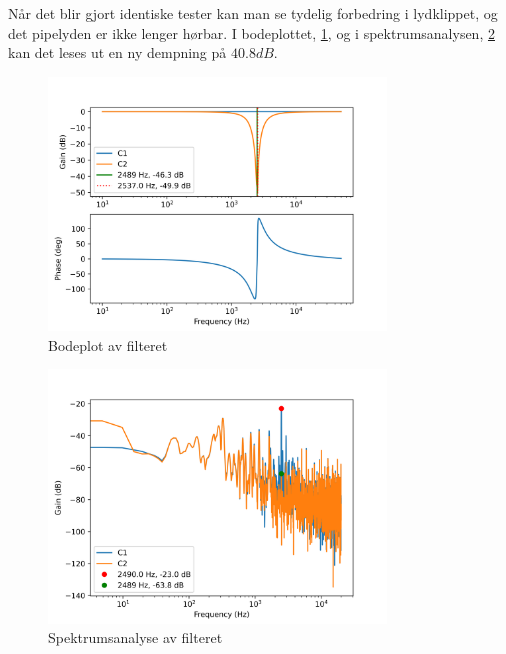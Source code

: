 Når det blir gjort identiske tester kan man se tydelig forbedring i lydklippet, og det pipelyden er ikke lenger hørbar. I bodeplottet, \ref{fig:fig9}, og i spektrumsanalysen, \ref{fig:fig10} kan det leses ut en ny dempning på $40.8dB$.

\begin{figure}[!h]
	\centering
	\includegraphics[width=0.8\textwidth]{Bilder/bode2x1K.png}
	\caption{Bodeplot av filteret}
	\label{fig:fig9}
\end{figure}

\begin{figure}[!h]
	\centering
	\includegraphics[width=0.8\textwidth]{Bilder/spectrum2x1K.png}
	\caption{Spektrumsanalyse av filteret}
	\label{fig:fig10}
\end{figure}

